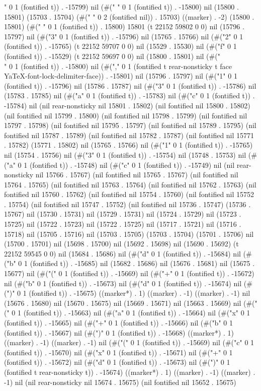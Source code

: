 " 0 1 (fontified t)) . -15799) nil (#(" " 0 1 (fontified t)) . -15800) nil (15800 . 15801) (15703 . 15704) (#("  " 0 2 (fontified nil)) . 15703) ((marker) . -2) (15800 . 15801) (#(" " 0 1 (fontified t)) . 15800) 15801 (t 22152 59802 0 0) nil (15796 . 15797) nil (#("3" 0 1 (fontified t)) . -15796) nil (15765 . 15766) nil (#("2" 0 1 (fontified t)) . -15765) (t 22152 59707 0 0) nil (15529 . 15530) nil (#("f" 0 1 (fontified t)) . -15529) (t 22152 59697 0 0) nil (15800 . 15801) nil (#("\\" 0 1 (fontified t)) . -15800) nil (#("," 0 1 (fontified t rear-nonsticky t face YaTeX-font-lock-delimiter-face)) . -15801) nil (15796 . 15797) nil (#("1" 0 1 (fontified t)) . -15796) nil (15786 . 15787) nil (#("3" 0 1 (fontified t)) . -15786) nil (15783 . 15785) nil (#("a" 0 1 (fontified t)) . -15783) nil (#("c" 0 1 (fontified t)) . -15784) nil (nil rear-nonsticky nil 15801 . 15802) (nil fontified nil 15800 . 15802) (nil fontified nil 15799 . 15800) (nil fontified nil 15798 . 15799) (nil fontified nil 15797 . 15798) (nil fontified nil 15795 . 15797) (nil fontified nil 15789 . 15795) (nil fontified nil 15787 . 15789) (nil fontified nil 15782 . 15787) (nil fontified nil 15771 . 15782) (15771 . 15802) nil (15765 . 15766) nil (#("1" 0 1 (fontified t)) . -15765) nil (15754 . 15756) nil (#("3" 0 1 (fontified t)) . -15754) nil (15748 . 15753) nil (#("a" 0 1 (fontified t)) . -15748) nil (#("c" 0 1 (fontified t)) . -15749) nil (nil rear-nonsticky nil 15766 . 15767) (nil fontified nil 15765 . 15767) (nil fontified nil 15764 . 15765) (nil fontified nil 15763 . 15764) (nil fontified nil 15762 . 15763) (nil fontified nil 15760 . 15762) (nil fontified nil 15754 . 15760) (nil fontified nil 15752 . 15754) (nil fontified nil 15747 . 15752) (nil fontified nil 15736 . 15747) (15736 . 15767) nil (15730 . 15731) nil (15729 . 15731) nil (15724 . 15729) nil (15723 . 15725) nil (15722 . 15723) nil (15722 . 15725) nil (15717 . 15721) nil (15716 . 15718) nil (15705 . 15716) nil (15703 . 15705) (15703 . 15704) (15701 . 15706) nil (15700 . 15701) nil (15698 . 15700) nil (15692 . 15698) nil (15690 . 15692) (t 22152 59545 0 0) nil (15684 . 15686) nil (#("d" 0 1 (fontified t)) . -15684) nil (#("b" 0 1 (fontified t)) . -15685) nil (15682 . 15686) nil (15676 . 15681) nil (15675 . 15677) nil (#("(" 0 1 (fontified t)) . -15669) nil (#("+" 0 1 (fontified t)) . -15672) nil (#("b" 0 1 (fontified t)) . -15673) nil (#("d" 0 1 (fontified t)) . -15674) nil (#(")" 0 1 (fontified t)) . -15675) ((marker*) . 1) ((marker) . -1) ((marker) . -1) nil (15676 . 15680) nil (15670 . 15675) nil (15669 . 15671) nil (15663 . 15669) nil (#("(" 0 1 (fontified t)) . -15663) nil (#("a" 0 1 (fontified t)) . -15664) nil (#("x" 0 1 (fontified t)) . -15665) nil (#("+" 0 1 (fontified t)) . -15666) nil (#("b" 0 1 (fontified t)) . -15667) nil (#(")" 0 1 (fontified t)) . -15668) ((marker*) . 1) ((marker) . -1) ((marker) . -1) nil (#("(" 0 1 (fontified t)) . -15669) nil (#("c" 0 1 (fontified t)) . -15670) nil (#("x" 0 1 (fontified t)) . -15671) nil (#("+" 0 1 (fontified t)) . -15672) nil (#("d" 0 1 (fontified t)) . -15673) nil (#(")" 0 1 (fontified t rear-nonsticky t)) . -15674) ((marker*) . 1) ((marker) . -1) ((marker) . -1) nil (nil rear-nonsticky nil 15674 . 15675) (nil fontified nil 15652 . 15675) 